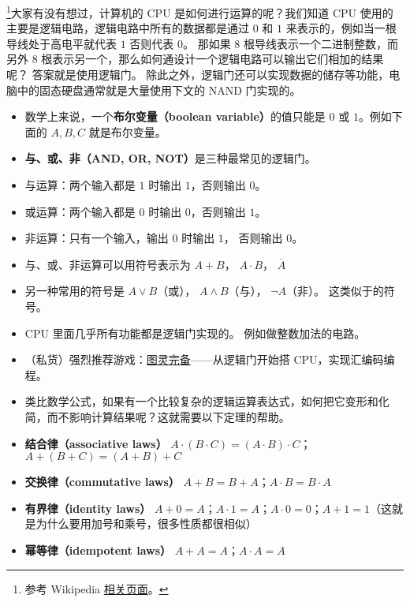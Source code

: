 
\begin{issues}
\issueDraft
\end{issues}

\footnote{参考 Wikipedia \href{https://en.wikipedia.org/wiki/Boolean_algebra}{相关页面}。}大家有没有想过，计算机的 CPU 是如何进行运算的呢？我们知道 CPU 使用的主要是逻辑电路，逻辑电路中所有的数据都是通过 $0$ 和 $1$ 来表示的，例如当一根导线处于高电平就代表 $1$ 否则代表 $0$。 那如果 8 根导线表示一个二进制整数，而另外 8 根表示另一个，那么如何通设计一个逻辑电路可以输出它们相加的结果呢？ 答案就是使用逻辑门。 除此之外，逻辑门还可以实现数据的储存等功能，电脑中的固态硬盘通常就是大量使用下文的 NAND 门实现的。

\begin{itemize}
\item 数学上来说，一个\textbf{布尔变量（boolean variable）}的值只能是 $0$ 或 $1$。例如下面的 $A,B,C$ 就是布尔变量。
\item \textbf{与、或、非（AND, OR, NOT）}是三种最常见的逻辑门。
\item 与运算：两个输入都是 $1$ 时输出 $1$，否则输出 $0$。
\item 或运算：两个输入都是 $0$ 时输出 $0$，否则输出 $1$。
\item 非运算：只有一个输入，输出 $0$ 时输出 $1$， 否则输出 $0$。
\item 与、或、非运算可以用符号表示为 $A + B$， $A\cdot B$， $\overline A$
\item 另一种常用的符号是 $A\lor B$（或）， $A\land B$（与）， $\neg A$（非）。 这类似于的符号。
\item CPU 里面几乎所有功能都是逻辑门实现的。 例如做整数加法的电路。
\item （私货）强烈推荐游戏：\href{https://turingcomplete.game/}{图灵完备}——从逻辑门开始搭 CPU，实现汇编码编程。
\item 类比数学公式，如果有一个比较复杂的逻辑运算表达式，如何把它变形和化简，而不影响计算结果呢？这就需要以下定理的帮助。
\item \textbf{结合律（associative laws）} $A\cdot(B\cdot C) = (A\cdot B)\cdot C$； $A+(B+C)=(A+B)+C$
\item \textbf{交换律（commutative laws）} $A+B=B+A$；$A\cdot B=B\cdot A$
\item \textbf{有界律（identity laws）} $A+0=A$；$A\cdot 1=A$；$A\cdot 0 = 0$；$A+1=1$（这就是为什么要用加号和乘号，很多性质都很相似）
\item \textbf{幂等律（idempotent laws）} $A+A=A$；$A\cdot A=A$

\end{itemize}
